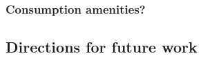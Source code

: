 \documentclass[a4paper]{article}
\theoremstyle{definition}
\theoremstyle{plain}
\begin{document}
{%




\subsubsection{Consumption amenities?}


\subsection{Directions for future work}

}
\end{document}
